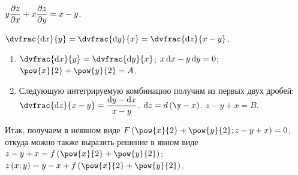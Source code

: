 \documentclass[a5paper,10pt]{article}
\begin{document}
    $y \dfrac{\partial z}{\partial x} + x \dfrac{\partial z}{\partial y} = x - y$.

    $\dvfrac {\di x} {y} = \dvfrac {\di y} {x} = \dvfrac {\di z} {x - y}$.

    \begin{enumerate}
        \item $\dvfrac {\di x} {y} = \dvfrac {\di y} {x}$; $x \di x - y \di y = 0$;
        $\pow{x}{2} + \pow{y}{2} = A$.

        \item Следующую интегрируемую комбинацию получим из первых двух дробей: \\
        $\dvfrac {\di z} {x - y} = \dfrac {\di y - \di x} {x - y}$.
        $\di z = d\br{\y - x}$.
        $z - y + x = B$.
    \end{enumerate}

    Итак, получаем в неявном виде
    $F\br{\pow{x}{2} + \pow{y}{2}; z - y + x} = 0$,
    откуда можно также выразить решение в явном виде
    $z - y + x = f\br{\pow{x}{2} + \pow{y}{2}}$;
    $z\br{x; y} = y - x + f\br{\pow{x}{2} + \pow{y}{2}}$.
\end{document}

